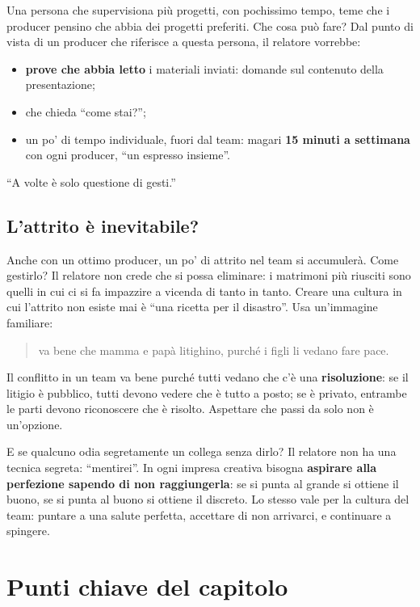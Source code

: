 Una persona che supervisiona più progetti, con pochissimo tempo, teme che i producer
pensino che abbia dei progetti preferiti. Che cosa può fare? Dal punto di vista di un
producer che riferisce a questa persona, il relatore vorrebbe:
\begin{itemize}
  \item \textbf{prove che abbia letto} i materiali inviati: domande sul contenuto
        della presentazione;
  \item che chieda ``come stai?'';
  \item un po' di tempo individuale, fuori dal team: magari \textbf{15 minuti a
        settimana} con ogni producer, ``un espresso insieme''.
\end{itemize}
``A volte è solo questione di gesti.''

\subsection{L'attrito è inevitabile?}

Anche con un ottimo producer, un po' di attrito nel team si accumulerà. Come
gestirlo? Il relatore non crede che si possa eliminare: i matrimoni più riusciti
sono quelli in cui ci si fa impazzire a vicenda di tanto in tanto. Creare una
cultura in cui l'attrito non esiste mai è ``una ricetta per il disastro''. Usa
un'immagine familiare:
\begin{quote}
va bene che mamma e papà litighino, purché i figli li vedano fare pace.
\end{quote}
Il conflitto in un team va bene purché tutti vedano che c'è una
\textbf{risoluzione}: se il litigio è pubblico, tutti devono vedere che è tutto a
posto; se è privato, entrambe le parti devono riconoscere che è risolto. Aspettare
che passi da solo non è un'opzione.

E se qualcuno odia segretamente un collega senza dirlo? Il relatore non ha una
tecnica segreta: ``mentirei''. In ogni impresa creativa bisogna
\textbf{aspirare alla perfezione sapendo di non raggiungerla}: se si punta al
grande si ottiene il buono, se si punta al buono si ottiene il discreto. Lo stesso
vale per la cultura del team: puntare a una salute perfetta, accettare di non
arrivarci, e continuare a spingere.

\section*{Punti chiave del capitolo}

